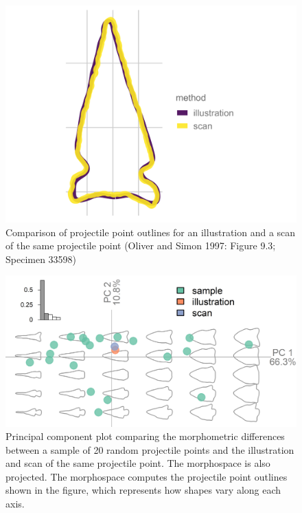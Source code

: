 \documentclass[a4paper]{article}
\begin{document}
\begin{figure}
\includegraphics[width=1\linewidth]{figures/pointComparison} \caption{Comparison of projectile point outlines for an illustration and a scan of the same projectile point (Oliver and Simon 1997: Figure 9.3; Specimen 33598)}\label{fig:pointComparison}
\end{figure}

\begin{figure}
\includegraphics[width=1\linewidth]{figures/comparisonPCA} \caption{Principal component plot comparing the morphometric differences between a sample of 20 random projectile points and the illustration and scan of the same projectile point. The morphospace is also projected. The morphospace computes the projectile point outlines shown in the figure, which represents how shapes vary along each axis.}\label{fig:comparisonPCA}
\end{figure}
\end{document}
